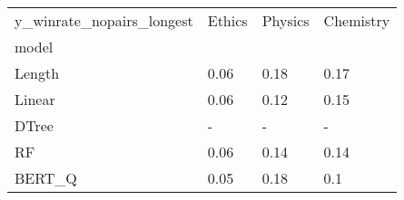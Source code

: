 \begin{tabular}{llll}
\toprule
y\_winrate\_nopairs\_longest & Ethics & Physics & Chemistry \\
model  &        &         &           \\
\midrule
Length &   0.06 &    0.18 &      0.17 \\
Linear &   0.06 &    0.12 &      0.15 \\
DTree  &      - &       - &         - \\
RF     &   0.06 &    0.14 &      0.14 \\
BERT\_Q &   0.05 &    0.18 &       0.1 \\
\bottomrule
\end{tabular}
